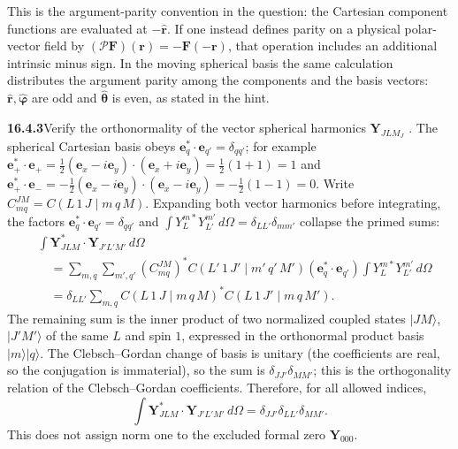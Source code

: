 This is the argument-parity convention in the question: the
Cartesian component functions are evaluated at $-\hat{\mathbf r}$.
If one instead defines parity on a physical polar-vector field by
$(\mathcal P\mathbf F)(\mathbf r)=-\mathbf F(-\mathbf r)$,
that operation includes an additional intrinsic minus sign.
In the moving spherical basis the same calculation distributes
the argument parity among the components and the basis vectors:
$\hat{\mathbf r},\hat{\boldsymbol\varphi}$ are odd and
$\hat{\boldsymbol\theta}$ is even, as stated in the hint.

\par\bigskip
\noindent\textbf{16.4.3}\quad Verify the orthonormality of the vector
spherical harmonics $\mathbf{Y}_{JLM_{J}}$
.
\solution
{}
The spherical Cartesian basis obeys
$\mathbf e_q^*\cdot\mathbf e_{q'}=\delta_{qq'}$; for example
$\mathbf e_+^*\cdot\mathbf e_+=\frac12(\mathbf e_x-i\mathbf e_y)\cdot
(\mathbf e_x+i\mathbf e_y)=\frac12(1+1)=1$ and
$\mathbf e_+^*\cdot\mathbf e_-=-\frac12(\mathbf e_x-i\mathbf e_y)\cdot
(\mathbf e_x-i\mathbf e_y)=-\frac12(1-1)=0$.
Write $C_{mq}^{JM}=C(L\,1\,J\mid m\,q\,M)$.
Expanding both vector harmonics before integrating, the factors
$\mathbf e_q^*\cdot\mathbf e_{q'}=\delta_{qq'}$ and
$\int Y_L^{m*}Y_{L'}^{m'}\,d\Omega=\delta_{LL'}\delta_{mm'}$
collapse the primed sums:
\[
\begin{aligned}
&\int\mathbf Y_{JLM}^*\cdot\mathbf Y_{J'L'M'}\,d\Omega\\
&\quad=\sum_{m,q}\sum_{m',q'}
(C_{mq}^{JM})^*C(L'\,1\,J'\mid m'\,q'\,M')
(\mathbf e_q^*\cdot\mathbf e_{q'})
\int Y_L^{m*}Y_{L'}^{m'}\,d\Omega\\
&\quad=\delta_{LL'}\sum_{m,q}
C(L\,1\,J\mid m\,q\,M)^*
C(L\,1\,J'\mid m\,q\,M').
\end{aligned}
\]
The remaining sum is the inner product of two normalized coupled
states $|J M\rangle$, $|J' M'\rangle$ of the same $L$ and spin $1$,
expressed in the orthonormal product basis $|m\rangle|q\rangle$. The
Clebsch--Gordan change of basis is unitary (the coefficients are real,
so the conjugation is immaterial), so the sum is
$\delta_{JJ'}\delta_{MM'}$; this is the orthogonality relation of the
Clebsch--Gordan coefficients. Therefore, for all allowed indices,
\[
\boxed{\int\mathbf Y_{JLM}^*\cdot\mathbf Y_{J'L'M'}\,d\Omega
=\delta_{JJ'}\delta_{LL'}\delta_{MM'}}.
\]
This does not assign norm one to the excluded formal zero
$\mathbf Y_{000}$.

